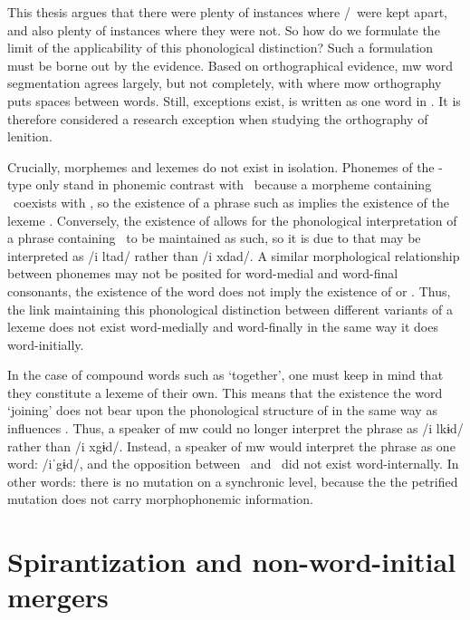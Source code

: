 This thesis argues that there were plenty of instances where \lT/\xD\ were kept apart, and also plenty of instances where they were not. 
So how do we formulate the limit of the applicability of this phonological distinction?
Such a formulation must be borne out by the evidence. Based on orthographical evidence, \gls{mw} word segmentation agrees largely, but not completely, with where \gls{mow} orthography puts spaces between words.
Still, exceptions exist, \eg {} is written as  one word in .
It is therefore considered a research exception when studying the orthography of lenition.

Crucially, morphemes and lexemes do not exist in isolation. 
Phonemes of the \lT -type only stand in phonemic contrast with \xD\ because a morpheme containing \lT\ coexists with \xT, so the existence of a phrase such as  implies the existence of the lexeme .
Conversely, the existence of  allows for the phonological interpretation of a phrase containing \lT\ to be maintained as such, so it is due to  that  may be interpreted as /i \gls{l}tad/ rather than /i \gls{x}dad/.
A similar morphological relationship between phonemes may not be posited for word-medial and word-final consonants, \eg the existence of the word  does not imply the existence of  or .
Thus, the link maintaining this phonological distinction between different variants of a lexeme does not exist word-medially and word-finally in the same way it does word-initially.

In the case of compound words such as  `together', one must keep in mind that they constitute a lexeme of their own. This means that the existence the word  `joining' does not bear upon the phonological structure of  in the same way as  influences .  Thus, a speaker of \gls{mw} could no longer  interpret the phrase  as /i \gls{l}kɨd/ rather than /i \gls{x}gɨd/. Instead, a speaker of \gls{mw} would interpret the phrase as one word: /iˈgɨd/, and the opposition between \lT\ and \xD\ did not exist word-internally. In other words: there is no mutation on a synchronic level, because the the petrified mutation does not carry morphophonemic information.





\section{Spirantization and non-word-initial mergers}
\label{sec:spirantization}

